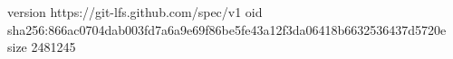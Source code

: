 version https://git-lfs.github.com/spec/v1
oid sha256:866ac0704dab003fd7a6a9e69f86be5fe43a12f3da06418b6632536437d5720e
size 2481245
